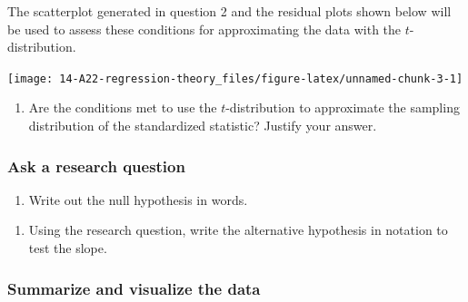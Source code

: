 \documentclass[
]{report}
\providecommand{\tightlist}{%
  \setlength{\itemsep}{0pt}\setlength{\parskip}{0pt}}
\begin{document}
The scatterplot generated in question 2 and the residual plots shown below will be used to assess these conditions for approximating the data with the \(t\)-distribution.

\begin{center}\texttt{[image: 14-A22-regression-theory\_files/figure-latex/unnamed-chunk-3-1]} \end{center}

\begin{enumerate}
\def\labelenumi{\arabic{enumi}.}
\setcounter{enumi}{4}
\tightlist
\item
  Are the conditions met to use the \(t\)-distribution to approximate the sampling distribution of the standardized statistic? Justify your answer.
\end{enumerate}

\vspace{1.5in}

\hypertarget{ask-a-research-question-7}{%
\subsubsection*{Ask a research question}\label{ask-a-research-question-7}}

\begin{enumerate}
\def\labelenumi{\arabic{enumi}.}
\setcounter{enumi}{5}
\tightlist
\item
  Write out the null hypothesis in words.
\end{enumerate}

\vspace{1in}

\begin{enumerate}
\def\labelenumi{\arabic{enumi}.}
\setcounter{enumi}{6}
\tightlist
\item
  Using the research question, write the alternative hypothesis in notation to test the slope.
\end{enumerate}

\vspace{0.5in}

\hypertarget{summarize-and-visualize-the-data-7}{%
\subsubsection*{Summarize and visualize the data}\label{summarize-and-visualize-the-data-7}}
\end{document}
